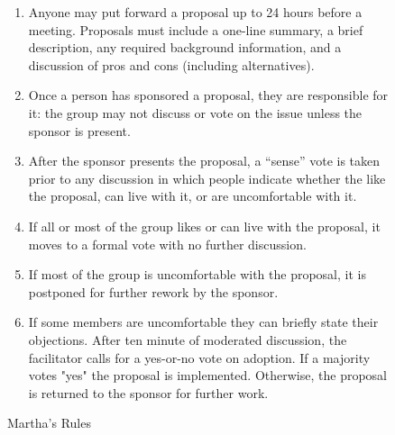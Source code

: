 \documentclass[10pt,letterpaper]{article}
\begin{document}
\begin{figure}[h]
\begin{tcolorbox}
\begin{enumerate}

\item
  Anyone may put forward a proposal up to 24 hours before a meeting.
  Proposals must include a one-line summary,
  a brief description,
  any required background information,
  and a discussion of pros and cons (including alternatives).

\item
  Once a person has sponsored a proposal, they are responsible for it:
  the group may not discuss or vote on the issue unless the sponsor is present.

\item
  After the sponsor presents the proposal,
  a ``sense'' vote is taken prior to any discussion
  in which people indicate whether the like the proposal,
  can live with it,
  or are uncomfortable with it.

\item
  If all or most of the group likes or can live with the proposal,
  it moves to a formal vote with no further discussion.

\item
  If most of the group is uncomfortable with the proposal,
  it is postponed for further rework by the sponsor.

\item
  If some members are uncomfortable they can briefly state their objections.
  After ten minute of moderated discussion,
  the facilitator calls for a yes-or-no vote on adoption.
  If a majority votes "yes" the proposal is implemented.
  Otherwise, the proposal is returned to the sponsor for further work.

\end{enumerate}
\caption{Martha's Rules}
\label{marthas-rules}
\end{tcolorbox}
\end{figure}

% 
\end{document}
